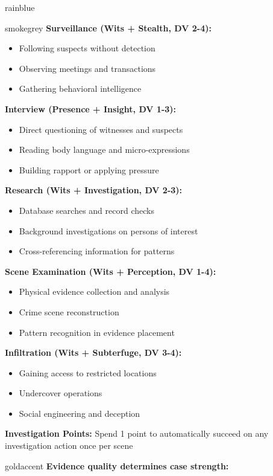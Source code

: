 \documentclass[11pt]{article}
\begin{document}
\begin{noirsection}{rainblue}
\begin{casebox}{smokegrey}
\textbf{Surveillance (Wits + Stealth, DV 2-4):}
\begin{itemize}
    \item Following suspects without detection
    \item Observing meetings and transactions
    \item Gathering behavioral intelligence
\end{itemize}

\textbf{Interview (Presence + Insight, DV 1-3):}
\begin{itemize}
    \item Direct questioning of witnesses and suspects
    \item Reading body language and micro-expressions
    \item Building rapport or applying pressure
\end{itemize}

\textbf{Research (Wits + Investigation, DV 2-3):}
\begin{itemize}
    \item Database searches and record checks
    \item Background investigations on persons of interest
    \item Cross-referencing information for patterns
\end{itemize}

\textbf{Scene Examination (Wits + Perception, DV 1-4):}
\begin{itemize}
    \item Physical evidence collection and analysis
    \item Crime scene reconstruction
    \item Pattern recognition in evidence placement
\end{itemize}

\textbf{Infiltration (Wits + Subterfuge, DV 3-4):}
\begin{itemize}
    \item Gaining access to restricted locations
    \item Undercover operations
    \item Social engineering and deception
\end{itemize}

\textbf{Investigation Points:} Spend 1 point to automatically succeed on any investigation action once per scene
\end{casebox}

\begin{casebox}{goldaccent}
\textbf{Evidence quality determines case strength:}


\end{casebox}
\end{noirsection}
\end{document}
